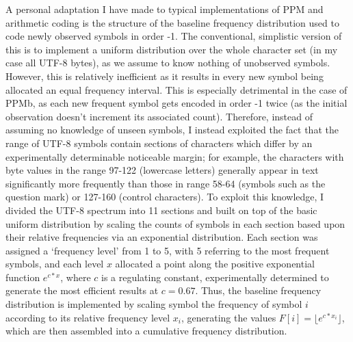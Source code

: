 \documentclass[a4paper, 11pt]{article}
\begin{document}
A personal adaptation I have made to typical implementations of PPM and arithmetic coding is the structure of the baseline frequency distribution used to code newly observed symbols in order -1. The conventional, simplistic version of this is to implement a uniform distribution over the whole character set (in my case all UTF-8 bytes), as we assume to know nothing of unobserved symbols. However, this is relatively inefficient as it results in every new symbol being allocated an equal frequency interval. This is especially detrimental in the case of PPMb, as each new frequent symbol gets encoded in order -1 twice (as the initial observation doesn’t increment its associated count). Therefore, instead of assuming no knowledge of unseen symbols, I instead exploited the fact that the range of UTF-8 symbols contain sections of characters which differ by an experimentally determinable noticeable margin; for example, the characters with byte values in the range 97-122 (lowercase letters) generally appear in text significantly more frequently than those in range 58-64 (symbols such as the question mark) or 127-160 (control characters). To exploit this knowledge, I divided the UTF-8 spectrum into 11 sections and built on top of the basic uniform distribution by scaling the counts of symbols in each section based upon their relative frequencies via an exponential distribution. Each section was assigned a ‘frequency level’ from 1 to 5, with 5 referring to the most frequent symbols, and each level $x$ allocated a point along the positive exponential function $e^{c * x}$, where $c$ is a regulating constant, experimentally determined to generate the most efficient results at $c = 0.67$. Thus, the baseline frequency distribution is implemented by scaling symbol the frequency of symbol $i$ according to its relative frequency level $x_i$, generating the values $F[i] = \lfloor e^{c * x_i} \rfloor$, which are then assembled into a cumulative frequency distribution.
\end{document}
